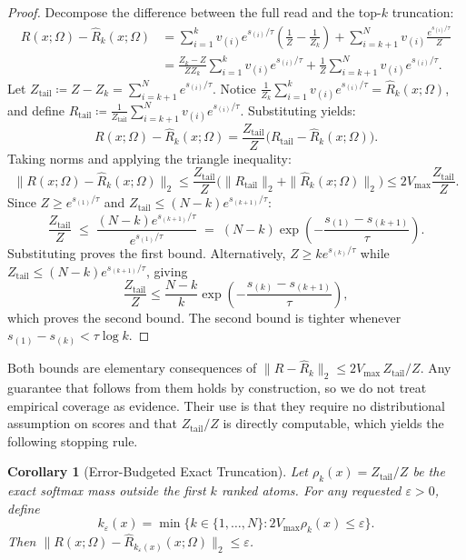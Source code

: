 \documentclass[preprint,12pt]{elsarticle}
\newtheorem{corollary}{Corollary}
\newcommand{\Om}{\Omega}
\newcommand{\rev}[1]{#1}
\begin{document}
\begin{proof}
Decompose the difference between the full read and the top-$k$ truncation:
\begin{align*}
  R(x; \Om) - \hat{R}_k(x; \Om) 
  &= \sum_{i=1}^k v_{(i)} e^{s_{(i)}/\tau} \left( \frac{1}{Z} - \frac{1}{Z_k} \right) + \sum_{i=k+1}^N v_{(i)} \frac{e^{s_{(i)}/\tau}}{Z} \\
  &= \frac{Z_k - Z}{Z Z_k} \sum_{i=1}^k v_{(i)} e^{s_{(i)}/\tau} + \frac{1}{Z} \sum_{i=k+1}^N v_{(i)} e^{s_{(i)}/\tau}.
\end{align*}
Let $Z_{\mathrm{tail}} \coloneqq Z - Z_k = \sum_{i=k+1}^N e^{s_{(i)}/\tau}$. Notice $\frac{1}{Z_k} \sum_{i=1}^k v_{(i)} e^{s_{(i)}/\tau} = \hat{R}_k(x; \Om)$, and define $R_{\mathrm{tail}} \coloneqq \frac{1}{Z_{\mathrm{tail}}} \sum_{i=k+1}^N v_{(i)} e^{s_{(i)}/\tau}$. Substituting yields:
\[
  R(x; \Om) - \hat{R}_k(x; \Om) = \frac{Z_{\mathrm{tail}}}{Z} \big( R_{\mathrm{tail}} - \hat{R}_k(x; \Om) \big).
\]
Taking norms and applying the triangle inequality:
\[
  \| R(x; \Om) - \hat{R}_k(x; \Om) \|_2 
  \le \frac{Z_{\mathrm{tail}}}{Z} \big( \|R_{\mathrm{tail}}\|_2 + \|\hat{R}_k(x; \Om)\|_2 \big) 
  \le 2 V_{\max} \frac{Z_{\mathrm{tail}}}{Z}.
\]
Since $Z \ge e^{s_{(1)}/\tau}$ and $Z_{\mathrm{tail}} \le (N - k) e^{s_{(k+1)}/\tau}$:
\[
  \frac{Z_{\mathrm{tail}}}{Z} \;\le\; \frac{(N - k) e^{s_{(k+1)}/\tau}}{e^{s_{(1)}/\tau}} \;=\; (N - k) \exp\left( -\frac{s_{(1)} - s_{(k+1)}}{\tau} \right).
\]
Substituting proves the first bound. Alternatively, $Z \ge k e^{s_{(k)}/\tau}$ while $Z_{\mathrm{tail}} \le (N-k) e^{s_{(k+1)}/\tau}$, giving
\[
  \frac{Z_{\mathrm{tail}}}{Z} \le \frac{N-k}{k}\exp\left(-\frac{s_{(k)}-s_{(k+1)}}{\tau}\right),
\]
which proves the second bound. The second bound is tighter whenever $s_{(1)} - s_{(k)} < \tau \log k$.
\end{proof}

Both bounds are elementary consequences of $\|R-\hat R_k\|_2 \le 2V_{\max}\,Z_{\mathrm{tail}}/Z$. \rev{Any guarantee that follows from them holds by construction, so we do not treat empirical coverage as evidence.} Their use is that they require no distributional assumption on scores and that $Z_{\mathrm{tail}}/Z$ is directly computable, which yields the following stopping rule.

\begin{corollary}[Error-Budgeted Exact Truncation]
\label{cor:adaptive_k}
Let $\rho_k(x) = Z_{\mathrm{tail}}/Z$ be the exact softmax mass outside the first $k$ ranked atoms. For any requested $\varepsilon > 0$, define
\[
  k_\varepsilon(x) = \min\{k \in \{1,\dots,N\} : 2 V_{\max} \rho_k(x) \le \varepsilon\}.
\]
Then $\|R(x;\Om) - \hat R_{k_\varepsilon(x)}(x;\Om)\|_2 \le \varepsilon$.
\end{corollary}
\end{document}
